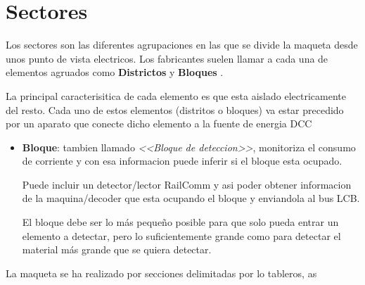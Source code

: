

\section{Sectores}
Los sectores son las diferentes agrupaciones en las que se divide la maqueta desde unos punto de vista electricos. Los fabricantes suelen llamar a cada una de elementos agruados como \textbf{Districtos} y \textbf{Bloques} .

La principal caracterisitica de cada elemento es que esta aislado electricamente del resto. Cada uno de estos elementos (distritos o bloques) va estar precedido por un aparato que conecte dicho elemento a la fuente de energia DCC

\begin{itemize}
\item \textbf{Bloque}: tambien llamado \textit{<<Bloque de deteccion>>}, monitoriza el consumo de corriente y con esa informacion puede inferir si el bloque esta ocupado. 

Puede incluir un detector/lector RailComm y asi poder obtener informacion de la maquina/decoder que esta ocupando el bloque y enviandola al bus LCB.

El bloque debe ser lo más pequeño posible para que solo pueda entrar un elemento a detectar, pero lo suficientemente grande como para detectar el material más grande que se quiera detectar.
\end{itemize}


La maqueta se ha realizado por secciones delimitadas por lo tableros, as 